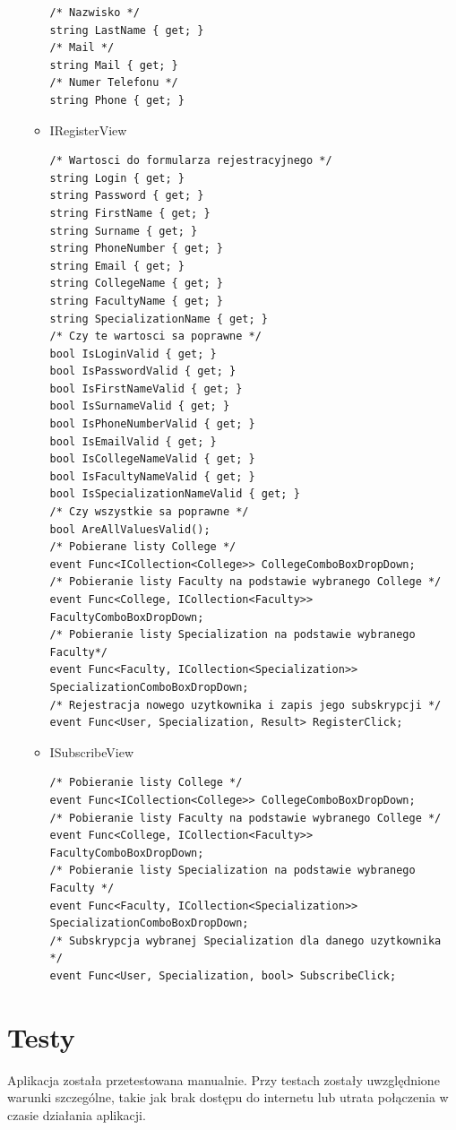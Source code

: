 \documentclass[12pt,a4paper]{article}
\begin{document}
\begin{itemize}
\begin{itemize}
\begin{lstlisting}
/* Nazwisko */
string LastName { get; }
/* Mail */
string Mail { get; }
/* Numer Telefonu */
string Phone { get; }
					\end{lstlisting}
 					\item IRegisterView
					\begin{lstlisting}
/* Wartosci do formularza rejestracyjnego */
string Login { get; }
string Password { get; }
string FirstName { get; }
string Surname { get; }
string PhoneNumber { get; }
string Email { get; }
string CollegeName { get; }
string FacultyName { get; }
string SpecializationName { get; }
/* Czy te wartosci sa poprawne */
bool IsLoginValid { get; }
bool IsPasswordValid { get; }
bool IsFirstNameValid { get; }
bool IsSurnameValid { get; }
bool IsPhoneNumberValid { get; }
bool IsEmailValid { get; }
bool IsCollegeNameValid { get; }
bool IsFacultyNameValid { get; }
bool IsSpecializationNameValid { get; }
/* Czy wszystkie sa poprawne */
bool AreAllValuesValid();
/* Pobierane listy College */
event Func<ICollection<College>> CollegeComboBoxDropDown;
/* Pobieranie listy Faculty na podstawie wybranego College */
event Func<College, ICollection<Faculty>> FacultyComboBoxDropDown;
/* Pobieranie listy Specialization na podstawie wybranego Faculty*/
event Func<Faculty, ICollection<Specialization>> SpecializationComboBoxDropDown;
/* Rejestracja nowego uzytkownika i zapis jego subskrypcji */
event Func<User, Specialization, Result> RegisterClick;

					\end{lstlisting}
					\item ISubscribeView 
					\begin{lstlisting}		
/* Pobieranie listy College */
event Func<ICollection<College>> CollegeComboBoxDropDown;
/* Pobieranie listy Faculty na podstawie wybranego College */
event Func<College, ICollection<Faculty>> FacultyComboBoxDropDown;
/* Pobieranie listy Specialization na podstawie wybranego Faculty */
event Func<Faculty, ICollection<Specialization>> SpecializationComboBoxDropDown;
/* Subskrypcja wybranej Specialization dla danego uzytkownika */
event Func<User, Specialization, bool> SubscribeClick;
			        \end{lstlisting}
				\end{itemize}
			\end{itemize}
\clearpage
	\section{Testy}
		Aplikacja została przetestowana manualnie. Przy testach zostały uwzględnione warunki szczególne, takie jak brak dostępu do internetu lub utrata połączenia w czasie działania aplikacji. 
\end{document}
